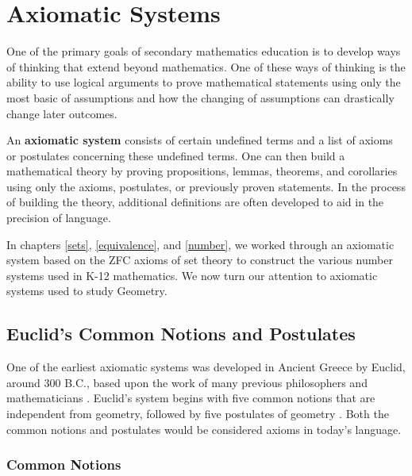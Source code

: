 \documentclass[
]{book}
\let\stdsection\section
\renewcommand\section{\newpage\stdsection}
\theoremstyle{definition}
\theoremstyle{definition}
\theoremstyle{definition}
\theoremstyle{definition}
\theoremstyle{remark}
\begin{document}
\hypertarget{axiomatic-systems}{%
\section{Axiomatic Systems}\label{axiomatic-systems}}

One of the primary goals of secondary mathematics education is to develop ways of thinking that extend beyond mathematics. One of these ways of thinking is the ability to use logical arguments to prove mathematical statements using only the most basic of assumptions and how the changing of assumptions can drastically change later outcomes.

An \textbf{axiomatic system} consists of certain undefined terms and a list of axioms or postulates concerning these undefined terms. One can then build a mathematical theory by proving propositions, lemmas, theorems, and corollaries using only the axioms, postulates, or previously proven statements. In the process of building the theory, additional definitions are often developed to aid in the precision of language.

In chapters \ref{sets}, \ref{equivalence}, and \ref{number}, we worked through an axiomatic system based on the ZFC axioms of set theory to construct the various number systems used in K-12 mathematics. We now turn our attention to axiomatic systems used to study Geometry.

\hypertarget{euclids-common-notions-and-postulates}{%
\subsection{Euclid's Common Notions and Postulates}\label{euclids-common-notions-and-postulates}}

One of the earliest axiomatic systems was developed in Ancient Greece by Euclid, around 300 B.C., based upon the work of many previous philosophers and mathematicians \citep{Heath1908_1}. Euclid's system begins with five common notions that are independent from geometry, followed by five postulates of geometry \citep[p.~154-155]{Heath1908_1}. Both the common notions and postulates would be considered axioms in today's language.

\hypertarget{common-notions}{%
\subsubsection*{Common Notions}\label{common-notions}}
\end{document}
